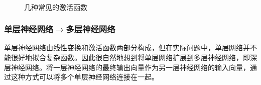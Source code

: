     \begin{figure}\centering
    \qquad
    \qquad
    \\    \vspace{-0.5em}
    \qquad
    \qquad
\caption{几种常见的激活函数}
\label{fig:5-15}
\end {figure}


\vspace{-0.5em}
\subsubsection{单层神经网络$\rightarrow$多层神经网络}

\parinterval 单层神经网络由线性变换和激活函数两部分构成，但在实际问题中，单层网络并不能很好地拟合复杂函数。因此很自然地想到将单层网络扩展到多层神经网络，即深层神经网络。将一层神经网络的最终输出向量作为另一层神经网络的输入向量，通过这种方式可以将多个单层神经网络连接在一起。

